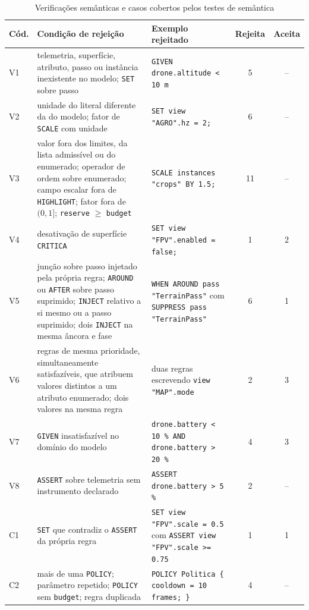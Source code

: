 \documentclass[conference]{IEEEtran}
\begin{document}
\begin{table}[t]
\caption{Verificações semânticas e casos cobertos pelos testes de semântica}
\label{tab:verificacoes}
\centering
\scriptsize
\setlength{\tabcolsep}{3pt}
\begin{tabularx}{\textwidth}{@{}l L >{\raggedright\arraybackslash}p{0.31\textwidth} c c@{}}
\toprule
\textbf{Cód.} & \textbf{Condição de rejeição} & \textbf{Exemplo rejeitado} &
\textbf{Rejeita} & \textbf{Aceita} \\
\midrule
V1 & telemetria, superfície, atributo, passo ou instância inexistente no modelo;
\texttt{SET} sobre passo & \texttt{GIVEN drone.altitude < 10 m} & 5 & -- \\
\addlinespace
V2 & unidade do literal diferente da do modelo; fator de \texttt{SCALE} com
unidade & \texttt{SET view "AGRO".hz = 2;} & 6 & -- \\
\addlinespace
V3 & valor fora dos limites, da lista admissível ou do enumerado; operador de
ordem sobre enumerado; campo escalar fora de \texttt{HIGHLIGHT}; fator fora de
$(0,1]$; \texttt{reserve} $\geq$ \texttt{budget} &
\texttt{SCALE instances "crops" BY 1.5;} & 11 & -- \\
\addlinespace
V4 & desativação de superfície \texttt{CRITICA} &
\texttt{SET view "FPV".enabled = false;} & 1 & 2 \\
\addlinespace
V5 & junção sobre passo injetado pela própria regra; \texttt{AROUND} ou
\texttt{AFTER} sobre passo suprimido; \texttt{INJECT} relativo a si mesmo ou a
passo suprimido; dois \texttt{INJECT} na mesma âncora e fase &
\texttt{WHEN AROUND pass "TerrainPass"} com \texttt{SUPPRESS pass "TerrainPass"}
& 6 & 1 \\
\addlinespace
V6 & regras de mesma prioridade, simultaneamente satisfazíveis, que atribuem
valores distintos a um atributo enumerado; dois valores na mesma regra &
duas regras escrevendo \texttt{view "MAP".mode} & 2 & 3 \\
\addlinespace
V7 & \texttt{GIVEN} insatisfazível no domínio do modelo &
\texttt{drone.battery < 10 \% AND} \texttt{drone.battery > 20 \%} & 4 & 3 \\
\addlinespace
V8 & \texttt{ASSERT} sobre telemetria sem instrumento declarado &
\texttt{ASSERT drone.battery > 5 \%} & 2 & -- \\
\midrule
C1 & \texttt{SET} que contradiz o \texttt{ASSERT} da própria regra &
\texttt{SET view "FPV".scale = 0.5} com \texttt{ASSERT view "FPV".scale >= 0.75}
& 1 & 1 \\
\addlinespace
C2 & mais de uma \texttt{POLICY}; parâmetro repetido; \texttt{POLICY} sem
\texttt{budget}; regra duplicada &
\texttt{POLICY Politica \{ cooldown = 10 frames; \}} & 4 & -- \\
\bottomrule
\end{tabularx}
\end{table}
\end{document}
